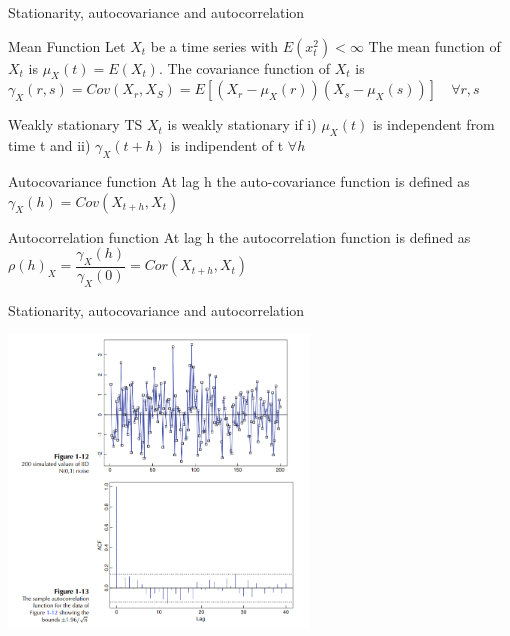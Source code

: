 \documentclass[11pt]{beamer}
\begin{document}
\begin{frame}{Stationarity, autocovariance and autocorrelation\cite{brockwell2002introduction}}
\small
\begin{alertblock}{Mean Function}
Let ${X_{t}}$ be a time series with $E({x}_{t}^{2})< \infty$  The mean function of ${X_{t}}$ is $\mu_{X}(t)=E(X_{t})$. The covariance function of ${X_{t}}$ is $\gamma_{X}(r,s)=Cov(X_{r},X_{S})=E[(X_{r}-\mu_{X}(r))(X_{s}-\mu_{X}(s))]\quad\forall r,s$ 
\end{alertblock}
\begin{alertblock}{Weakly stationary TS}
${X_{t}}$ is weakly stationary if i) $\mu_{X}(t)$ is independent from time t and ii) $\gamma_{X}(t+h)$ is indipendent of t $\forall h$
\end{alertblock}
\begin{alertblock}{Autocovariance function}
At lag h the auto-covariance function is defined as $\gamma_{X}(h)=Cov(X_{t+h},X_{t})$ 
\end{alertblock}
\begin{alertblock}{Autocorrelation function}
At lag h the autocorrelation function is defined as $\rho(h)_{X}=\dfrac{\gamma_{X}(h)}{\gamma_{X}(0)}=Cor({X}_{t+h},{X}_{t})$ 
\end{alertblock}
\end{frame}

\begin{frame}{Stationarity, autocovariance and autocorrelation \cite{brockwell2002introduction}}
    \begin{center}
     \includegraphics[width=0.6\textwidth]{Pic/ACF.png}
    \end{center}
\end{frame}
\end{document}
